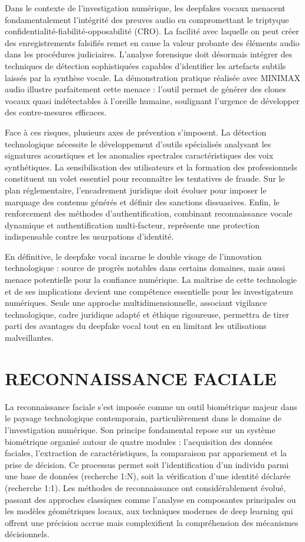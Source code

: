 \documentclass[12pt, a4paper]{article}
\begin{document}
		Dans le contexte de l'investigation numérique, les deepfakes vocaux menacent fondamentalement l'intégrité des preuves audio en compromettant le triptyque confidentialité-fiabilité-opposabilité (CRO). La facilité avec laquelle on peut créer des enregistrements falsifiés remet en cause la valeur probante des éléments audio dans les procédures judiciaires. L'analyse forensique doit désormais intégrer des techniques de détection sophistiquées capables d'identifier les artefacts subtils laissés par la synthèse vocale. La démonstration pratique réalisée avec MINIMAX audio illustre parfaitement cette menace : l'outil permet de générer des clones vocaux quasi indétectables à l'oreille humaine, soulignant l'urgence de développer des contre-mesures efficaces.
		
		Face à ces risques, plusieurs axes de prévention s'imposent. La détection technologique nécessite le développement d'outils spécialisés analysant les signatures acoustiques et les anomalies spectrales caractéristiques des voix synthétiques. La sensibilisation des utilisateurs et la formation des professionnels constituent un volet essentiel pour reconnaître les tentatives de fraude. Sur le plan réglementaire, l'encadrement juridique doit évoluer pour imposer le marquage des contenus générés et définir des sanctions dissuasives. Enfin, le renforcement des méthodes d'authentification, combinant reconnaissance vocale dynamique et authentification multi-facteur, représente une protection indispensable contre les usurpations d'identité.
		
		En définitive, le deepfake vocal incarne le double visage de l'innovation technologique : source de progrès notables dans certains domaines, mais aussi menace potentielle pour la confiance numérique. La maîtrise de cette technologie et de ses implications devient une compétence essentielle pour les investigateurs numériques. Seule une approche multidimensionnelle, associant vigilance technologique, cadre juridique adapté et éthique rigoureuse, permettra de tirer parti des avantages du deepfake vocal tout en en limitant les utilisations malveillantes.
		
		\section{RECONNAISSANCE FACIALE}
		
		La reconnaissance faciale s'est imposée comme un outil biométrique majeur dans le paysage technologique contemporain, particulièrement dans le domaine de l'investigation numérique. Son principe fondamental repose sur un système biométrique organisé autour de quatre modules : l'acquisition des données faciales, l'extraction de caractéristiques, la comparaison par appariement et la prise de décision. Ce processus permet soit l'identification d'un individu parmi une base de données (recherche 1:N), soit la vérification d'une identité déclarée (recherche 1:1). Les méthodes de reconnaissance ont considérablement évolué, passant des approches classiques comme l'analyse en composantes principales ou les modèles géométriques locaux, aux techniques modernes de deep learning qui offrent une précision accrue mais complexifient la compréhension des mécanismes décisionnels.
		
\end{document}
